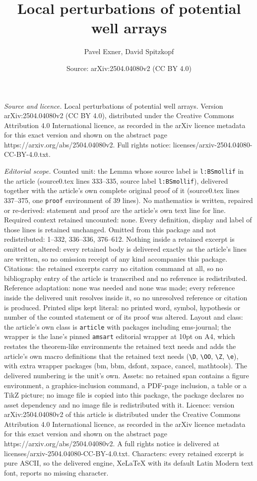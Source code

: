 \documentclass[10pt,a4paper]{amsart}
\title[Local perturbations of potential well arrays]{Local perturbations of potential well arrays}
\author{Pavel Exner, David Spitzkopf}
\date{Source: arXiv:2504.04080v2 (CC BY 4.0)}
\begin{document}
\maketitle

\noindent\emph{Source and licence.} Local perturbations of potential well arrays. Version arXiv:2504.04080v2 (CC BY 4.0), distributed under the Creative Commons Attribution 4.0 International licence, as recorded in the arXiv licence metadata for this exact version and shown on the abstract page https://arxiv.org/abs/2504.04080v2. Full rights notice: licenses/arxiv-2504.04080-CC-BY-4.0.txt.\par\smallskip

\noindent\textit{Editorial scope.} Counted unit: the Lemma whose source label is \texttt{l:BSmollif} in the article (source0.tex lines 333--335, source label \texttt{l:BSmollif}), delivered together with the article's own complete original proof of it (source0.tex lines 337--375, one \texttt{proof} environment of 39 lines). No mathematics is written, repaired or re-derived: statement and proof are the article's own text line for line. Required context retained uncounted: none. Every definition, display and label of those lines is retained unchanged. Omitted from this package and not redistributed: 1--332, 336--336, 376--612. Nothing inside a retained excerpt is omitted or altered: every retained body is delivered exactly as the article's lines are written, so no omission receipt of any kind accompanies this package. Citations: the retained excerpts carry no citation command at all, so no bibliography entry of the article is transcribed and no reference is redistributed. Reference adaptation: none was needed and none was made; every reference inside the delivered unit resolves inside it, so no unresolved reference or citation is produced. Printed slips kept literal: no printed word, symbol, hypothesis or number of the counted statement or of its proof was altered. Layout and class: the article's own class is \texttt{article} with packages including ems-journal; the wrapper is the lane's pinned \texttt{amsart} editorial wrapper at 10pt on A4, which restates the theorem-like environments the retained text needs and adds the article's own macro definitions that the retained text needs (\texttt{\textbackslash D}, \texttt{\textbackslash OO}, \texttt{\textbackslash Z}, \texttt{\textbackslash e}), with extra wrapper packages (bm, bbm, dsfont, xspace, cancel, mathtools). The delivered numbering is the unit's own. Assets: no retained span contains a figure environment, a graphics-inclusion command, a PDF-page inclusion, a table or a TikZ picture; no image file is copied into this package, the package declares no asset dependency and no image file is redistributed with it. Licence: version arXiv:2504.04080v2 of this article is distributed under the Creative Commons Attribution 4.0 International licence, as recorded in the arXiv licence metadata for this exact version and shown on the abstract page https://arxiv.org/abs/2504.04080v2. A full rights notice is delivered at licenses/arxiv-2504.04080-CC-BY-4.0.txt. Characters: every retained excerpt is pure ASCII, so the delivered engine, XeLaTeX with its default Latin Modern text font, reports no missing character.
\end{document}
